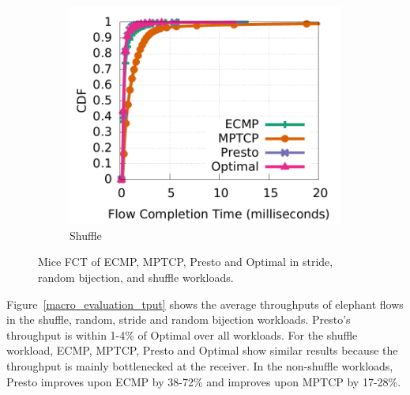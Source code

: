 \begin{figure}[!t]
\begin{subfigure}[b]{0.3\textwidth}
        	\label{macro_evaluation_fct_bijection}
	\end{subfigure}
        \begin{subfigure}[b]{0.3\textwidth}
                \centering
		\includegraphics[width=\textwidth]{./figures/macro/shuffle/macro_compare_fct_shuffle_mice.pdf}
        	\caption{Shuffle}
        	\label{macro_evaluation_fct_shuffle}
	\end{subfigure}
	\caption{Mice FCT of ECMP, MPTCP, Presto and Optimal in stride, random bijection, and shuffle workloads.}
	\label{macro_evaluation_fct}
\end{figure}

Figure~\ref{macro_evaluation_tput} 
shows the average throughputs of elephant flows in the shuffle, random, stride and random bijection workloads.
Presto's throughput is within 1-4\% of Optimal over all workloads.
For the shuffle workload, ECMP, MPTCP, Presto and Optimal show similar results 
because the throughput is mainly bottlenecked at the receiver. 
In the non-shuffle workloads, Presto improves upon ECMP by 38-72\% and improves
upon MPTCP by 17-28\%.


